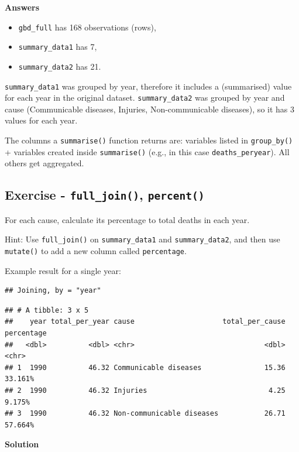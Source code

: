 \documentclass[
  12pt,
  krantz2]{krantz}
\providecommand{\tightlist}{%
  \setlength{\itemsep}{0pt}\setlength{\parskip}{0pt}}
\begin{document}
\textbf{Answers}

\begin{itemize}
\tightlist
\item
  \texttt{gbd\_full} has 168 observations (rows),
\item
  \texttt{summary\_data1} has 7,
\item
  \texttt{summary\_data2} has 21.
\end{itemize}

\texttt{summary\_data1} was grouped by year, therefore it includes a (summarised) value for each year in the original dataset.
\texttt{summary\_data2} was grouped by year and cause (Communicable diseases, Injuries, Non-communicable diseases), so it has 3 values for each year.

The columns a \texttt{summarise()} function returns are: variables listed in \texttt{group\_by()} + variables created inside \texttt{summarise()} (e.g., in this case \texttt{deaths\_peryear}). All others get aggregated.

\hypertarget{exercise---full_join-percent}{%
\subsection{\texorpdfstring{Exercise - \texttt{full\_join()}, \texttt{percent()}}{Exercise - full\_join(), percent()}}\label{exercise---full_join-percent}}

For each cause, calculate its percentage to total deaths in each year.

Hint: Use \texttt{full\_join()} on \texttt{summary\_data1} and \texttt{summary\_data2}, and then use \texttt{mutate()} to add a new column called \texttt{percentage}.

Example result for a single year:

\begin{verbatim}
## Joining, by = "year"
\end{verbatim}

\begin{verbatim}
## # A tibble: 3 x 5
##    year total_per_year cause                     total_per_cause percentage
##   <dbl>          <dbl> <chr>                               <dbl> <chr>     
## 1  1990          46.32 Communicable diseases               15.36 33.161%   
## 2  1990          46.32 Injuries                             4.25 9.175%    
## 3  1990          46.32 Non-communicable diseases           26.71 57.664%
\end{verbatim}

\textbf{Solution}
\end{document}
